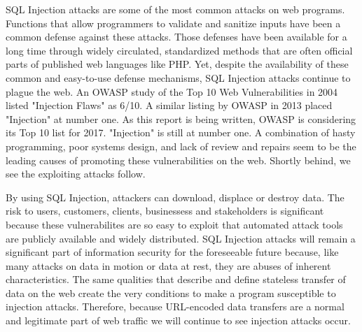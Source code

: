 SQL Injection attacks are some of the most common attacks on web programs.  Functions that allow programmers to validate and sanitize inputs have been a common defense against these attacks.  Those defenses have been available for a long time through widely circulated, standardized methods that are often official parts of published web languages like PHP.   Yet, despite the availability of these common and easy-to-use defense mechanisms, SQL Injection attacks continue to plague the web.  An OWASP study of the Top 10 Web Vulnerabilities in 2004 listed "Injection Flaws" as 6/10. A similar listing by OWASP in 2013 placed "Injection" at number one.   As this report is being written, OWASP is considering its Top 10 list for 2017.  "Injection" is still at number one.   A combination of hasty programming, poor systems design, and lack of review and repairs seem to be the leading causes of promoting these vulnerabilities on the web.  Shortly behind, we see the exploiting attacks follow.

By using SQL Injection, attackers can download, displace or destroy data.  The risk to users, customers, clients, businessess and stakeholders is significant because these vulnerabilites are so easy to \gls{exploit} that automated \gls{attack} tools are publicly available and widely distributed.  SQL Injection attacks will remain a significant part of information security for the foreseeable future because, like many attacks on data in motion or data at rest, they are abuses of inherent characteristics.  The same qualities that describe and define stateless transfer of data on the web create the very conditions to make a program susceptible to injection attacks.  Therefore, because URL-encoded data transfers are a normal and legitimate part of web traffic we will continue to see injection attacks occur.


